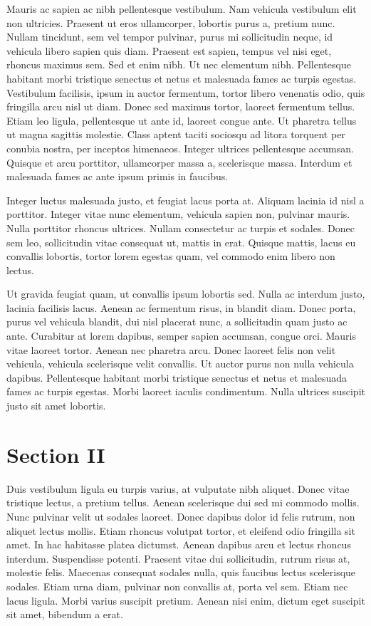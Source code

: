 \documentclass[%
 reprint,
 amsmath,amssymb,
 aps,
]{revtex4-2}
\begin{document}
Mauris ac sapien ac nibh pellentesque vestibulum. Nam vehicula vestibulum elit non ultricies. Praesent ut eros ullamcorper, lobortis purus a, pretium nunc. Nullam tincidunt, sem vel tempor pulvinar, purus mi sollicitudin neque, id vehicula libero sapien quis diam. Praesent est sapien, tempus vel nisi eget, rhoncus maximus sem. Sed et enim nibh. Ut nec elementum nibh. Pellentesque habitant morbi tristique senectus et netus et malesuada fames ac turpis egestas. Vestibulum facilisis, ipsum in auctor fermentum, tortor libero venenatis odio, quis fringilla arcu nisl ut diam. Donec sed maximus tortor, laoreet fermentum tellus. Etiam leo ligula, pellentesque ut ante id, laoreet congue ante. Ut pharetra tellus ut magna sagittis molestie. Class aptent taciti sociosqu ad litora torquent per conubia nostra, per inceptos himenaeos. Integer ultrices pellentesque accumsan. Quisque et arcu porttitor, ullamcorper massa a, scelerisque massa. Interdum et malesuada fames ac ante ipsum primis in faucibus.

Integer luctus malesuada justo, et feugiat lacus porta at. Aliquam lacinia id nisl a porttitor. Integer vitae nunc elementum, vehicula sapien non, pulvinar mauris. Nulla porttitor rhoncus ultrices. Nullam consectetur ac turpis et sodales. Donec sem leo, sollicitudin vitae consequat ut, mattis in erat. Quisque mattis, lacus eu convallis lobortis, tortor lorem egestas quam, vel commodo enim libero non lectus.

Ut gravida feugiat quam, ut convallis ipsum lobortis sed. Nulla ac interdum justo, lacinia facilisis lacus. Aenean ac fermentum risus, in blandit diam. Donec porta, purus vel vehicula blandit, dui nisl placerat nunc, a sollicitudin quam justo ac ante. Curabitur at lorem dapibus, semper sapien accumsan, congue orci. Mauris vitae laoreet tortor. Aenean nec pharetra arcu. Donec laoreet felis non velit vehicula, vehicula scelerisque velit convallis. Ut auctor purus non nulla vehicula dapibus. Pellentesque habitant morbi tristique senectus et netus et malesuada fames ac turpis egestas. Morbi laoreet iaculis condimentum. Nulla ultrices suscipit justo sit amet lobortis.
\section{\label{sec:intro} Section II}
Duis vestibulum ligula eu turpis varius, at vulputate nibh aliquet. Donec vitae tristique lectus, a pretium tellus. Aenean scelerisque dui sed mi commodo mollis. Nunc pulvinar velit ut sodales laoreet. Donec dapibus dolor id felis rutrum, non aliquet lectus mollis. Etiam rhoncus volutpat tortor, et eleifend odio fringilla sit amet. In hac habitasse platea dictumst. Aenean dapibus arcu et lectus rhoncus interdum. Suspendisse potenti. Praesent vitae dui sollicitudin, rutrum risus at, molestie felis. Maecenas consequat sodales nulla, quis faucibus lectus scelerisque sodales. Etiam urna diam, pulvinar non convallis at, porta vel sem. Etiam nec lacus ligula. Morbi varius suscipit pretium. Aenean nisi enim, dictum eget suscipit sit amet, bibendum a erat.
\end{document}
